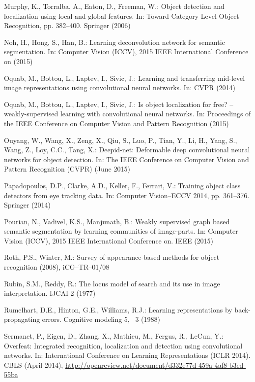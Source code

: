 \documentclass[runningheads]{llncs}
\begin{document}
\begin{thebibliography}{10}
Murphy, K., Torralba, A., Eaton, D., Freeman, W.: Object detection and
  localization using local and global features. In: Toward Category-Level
  Object Recognition, pp. 382--400. Springer (2006)

Noh, H., Hong, S., Han, B.: Learning deconvolution network for semantic
  segmentation. In: Computer Vision (ICCV), 2015 IEEE International Conference
  on (2015)

Oquab, M., Bottou, L., Laptev, I., Sivic, J.: Learning and transferring
  mid-level image representations using convolutional neural networks. In: CVPR
  (2014)

Oquab, M., Bottou, L., Laptev, I., Sivic, J.: Is object localization for free?
  – weakly-supervised learning with convolutional neural networks. In:
  Proceedings of the IEEE Conference on Computer Vision and Pattern Recognition
  (2015)

Ouyang, W., Wang, X., Zeng, X., Qiu, S., Luo, P., Tian, Y., Li, H., Yang, S.,
  Wang, Z., Loy, C.C., Tang, X.: Deepid-net: Deformable deep convolutional
  neural networks for object detection. In: The IEEE Conference on Computer
  Vision and Pattern Recognition (CVPR) (June 2015)

Papadopoulos, D.P., Clarke, A.D., Keller, F., Ferrari, V.: Training object
  class detectors from eye tracking data. In: Computer Vision--ECCV 2014, pp.
  361--376. Springer (2014)

Pourian, N., Vadivel, K.S., Manjunath, B.: Weakly supervised graph based
  semantic segmentation by learning communities of image-parts. In: Computer
  Vision (ICCV), 2015 IEEE International Conference on. IEEE (2015)

Roth, P.S., Winter, M.: Survey of appearance-based methods for object
  recognition (2008), iCG–TR–01/08

Rubin, S.M., Reddy, R.: The locus model of search and its use in image
  interpretation. IJCAI  2 (1977)

Rumelhart, D.E., Hinton, G.E., Williams, R.J.: Learning representations by
  back-propagating errors. Cognitive modeling  5, ~3 (1988)

Sermanet, P., Eigen, D., Zhang, X., Mathieu, M., Fergus, R., LeCun, Y.:
  Overfeat: Integrated recognition, localization and detection using
  convolutional networks. In: International Conference on Learning
  Representations (ICLR 2014). CBLS (April 2014),
  \url{http://openreview.net/document/d332e77d-459a-4af8-b3ed-55ba}


\end{thebibliography}
\end{document}
